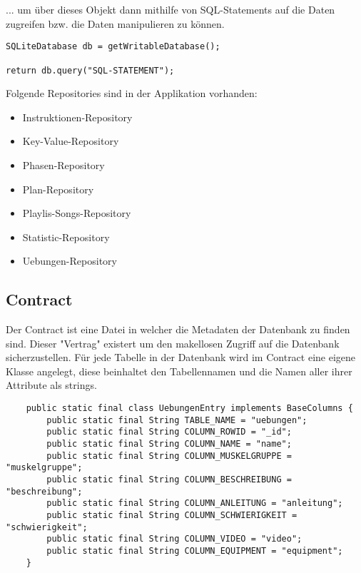 \documentclass[FIPLY_base.tex]{subfiles}
\begin{document}
... um über dieses Objekt dann mithilfe von SQL-Statements auf die Daten zugreifen bzw. die Daten manipulieren zu können.
\begin{lstlisting}
SQLiteDatabase db = getWritableDatabase();

return db.query("SQL-STATEMENT");
\end{lstlisting}


Folgende Repositories sind in der Applikation vorhanden:
\begin{itemize}
\item Instruktionen-Repository
\item Key-Value-Repository
\item Phasen-Repository
\item Plan-Repository
\item Playlis-Songs-Repository
\item Statistic-Repository
\item Uebungen-Repository
\end{itemize}

\newpage
\subsection{Contract}
Der Contract ist eine Datei in welcher die Metadaten der Datenbank zu finden sind.
Dieser "Vertrag" existert um den makellosen Zugriff auf die Datenbank sicherzustellen.
Für jede Tabelle in der Datenbank wird im Contract eine eigene Klasse angelegt, diese beinhaltet den Tabellennamen und die Namen aller ihrer Attribute als strings.
\begin{lstlisting}
    public static final class UebungenEntry implements BaseColumns {
        public static final String TABLE_NAME = "uebungen";
        public static final String COLUMN_ROWID = "_id";
        public static final String COLUMN_NAME = "name";
        public static final String COLUMN_MUSKELGRUPPE = "muskelgruppe";
        public static final String COLUMN_BESCHREIBUNG = "beschreibung";
        public static final String COLUMN_ANLEITUNG = "anleitung";
        public static final String COLUMN_SCHWIERIGKEIT = "schwierigkeit";
        public static final String COLUMN_VIDEO = "video";
        public static final String COLUMN_EQUIPMENT = "equipment";
    }
\end{lstlisting}
\end{document}
